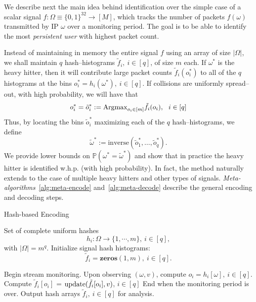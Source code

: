 \documentclass[10pt, conference, letterpaper,onecolumn]{IEEEtranv1.8}
\renewcommand\P{\mathbb P}
\theoremstyle{plain}\newtheorem{thm}{Theorem}\newtheorem{lem}{Lemma}
\theoremstyle{definition}
\begin{document}
We describe next the main idea behind identification over the simple case of a scalar signal $f:\Omega\equiv \{0,1\}^{32} \to [M]$,
which tracks the number of packets $f(\omega)$ transmitted by IP $\omega$ over a monitoring period. The goal is to be able to identify
the most {\em persistent user} with highest packet count.

Instead of maintaining in memory the entire signal $f$ using an array of size $|\Omega|$, we shall maintain $q$ hash--histograms 
$\tilde f_i,\ i \in[q]$, of size $m$ each. If $\omega^*$ is the heavy hitter, then it will contribute large packet counts
$\tilde f_i(o_i^*)$ to all of the $q$ histograms at the bins $o_i^* = h_i(\omega^*),\  i\in[q]$.
If collisions are uniformly spread--out, with high probability, we will have that
$$
o_i^* = \tilde o_i^* := {\rm Argmax}_{o_i\in[m]} \tilde f_i(o_i),\ \ i\in[q]
$$
Thus, by locating the bins $\tilde o_i^*$ maximizing each of the $q$ hash--histograms, we define
\begin{equation}\label{e:inverse}
\tilde\omega^* := \text{inverse}(\tilde o_1^*,\ldots,\tilde o_q^*).
\end{equation}
We provide lower bounds on $\P(\omega^* = \tilde \omega^*)$ and show that
in practice the heavy hitter is identified w.h.p. (with high probability).
In fact, the method naturally extends to the case of multiple heavy hitters and other 
types of signals. {\em Meta-algorithms}~\ref{alg:meta-encode} and~\ref{alg:meta-decode} 
describe the general encoding  and decoding steps. 

\renewcommand{\thealgorithm}{\roman{algorithm}}

\begin{algorithm}[t]
\caption{Hash-based Encoding}
\label{alg:meta-encode}
\begin{algorithmic}[1]
\REQUIRE Set of complete uniform hashes 
 $$
  h_i:\Omega\to \{1,\cdots,m\},\ i \in[q],
 $$
 with $|\Omega| = m^q$. Initialize signal hash histograms: 
 $$
  \tilde f_{i} = {\mathbf{zeros}}(1,m),\ i\in[q].
 $$

\STATE [Start] Begin stream monitoring.
 Upon observing $(\omega,v)$, compute $o_i = h_i[\omega],\ i\in[q]$.
\STATE [Update] Compute $ \tilde f_i[o_i]$ = ${\rm update}( \tilde f_i[o_i], v)$,  $i\in[q]$
\STATE [Stop] End when the monitoring period is over.
\RETURN Output hash arrays $\tilde f_i,\ i\in[q]$ for analysis.
\end{algorithmic}
\end{algorithm}
\end{document}
